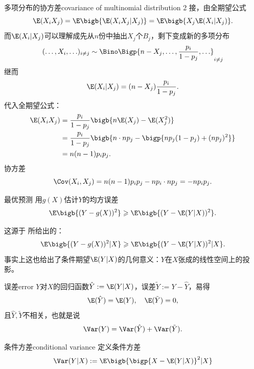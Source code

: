 \begin{example}{多项分布的协方差}{covariance of multinomial distribution 2}
	接，由全期望公式
	\[
		\E(X_iX_j)=\E\bigb{\E(X_iX_j|X_j)}=\E\bigb{X_j\E(X_i|X_j)}.
	\]
	而$\E(X_i|X_j)$可以理解成先从$n$份中抽出$X_j$个$B_j$，剩下变成新的多项分布
	\[
		(\ldots,X_i,\ldots)_{i\neq j}\sim\Bino\Bigp{n-X_j,\ldots,\frac{p_i}{1-p_j},\ldots}_{i\neq j}
	\]
	继而
	\[
		\E(X_i|X_j)=(n-X_j)\frac{p_i}{1-p_j}.
	\]
	代入全期望公式：
	\begin{align*}
		\E(X_iX_j)&=\frac{p_i}{1-p_j}\bigb{n\E(X_j)-\E(X_j^2)}\\
		&=\frac{p_i}{1-p_j}\bigb{n\cdot np_j-\bigp{np_j(1-p_j)+(np_j)^2}}\\
		&=n(n-1)p_ip_j.
	\end{align*}
	协方差
	\[
		\Cov(X_i,X_j)=n(n-1)p_ip_j-np_i\cdot np_j=-np_ip_j.
	\]
\end{example}
\begin{theorem}{最优预测}{}
	用$g(X)$估计$Y$的均方误差
	\begin{equation}
		\E\bigb{(Y-g(X))^2}\geqslant\E\bigb{(Y-\E(Y|X))^2}.
	\end{equation}
\end{theorem}
这源于 所给出的：
\[
	\E\bigb{(Y-g(X))^2|X}\geqslant\E\bigb{(Y-\E(Y|X))^2|X}.
\]
事实上这也给出了条件期望$\E(Y|X)$的几何意义：$Y$在$X$张成的线性空间上的投影。
\begin{example}{误差}{error}
	$Y$对$X$的回归函数$\hat Y:=\E(Y|X)$，误差$\tilde Y:=Y-\hat Y$，易得
	\[
		\E(\hat Y)=\E(Y),\quad\E(\tilde Y)=0,
	\]
	且$\hat Y,\tilde Y$不相关，也就是说
	\[
		\Var(Y)=\Var(\hat Y)+\Var(\tilde Y).
	\]
	\begin{center}
	\end{center}
\end{example}
\begin{definition}{条件方差}{conditional variance}
	定义条件方差
	\begin{equation}
		\Var(Y|X):=\E\bigb{\bigp{X-\E(Y|X)}^2|X}
	\end{equation}
\end{definition}
